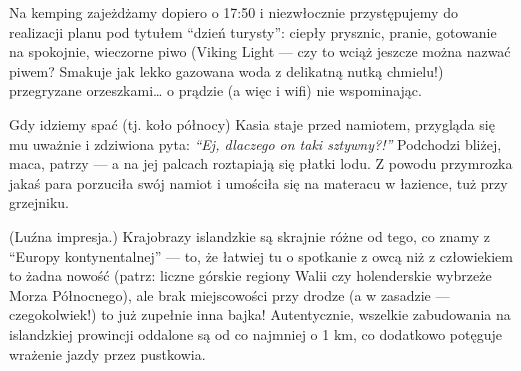 
Na kemping zajeżdżamy dopiero o 17:50 i niezwłocznie przystępujemy do realizacji planu pod tytułem “dzień turysty”: ciepły prysznic, pranie, gotowanie na spokojnie, wieczorne piwo (Viking Light --- czy to wciąż jeszcze można nazwać piwem? Smakuje jak lekko gazowana woda z delikatną nutką chmielu!) przegryzane orzeszkami… o prądzie (a więc i wifi) nie wspominając.

Gdy idziemy spać (tj. koło północy) Kasia staje przed namiotem, przygląda się mu uważnie i zdziwiona pyta: \emph{“Ej, dlaczego on taki sztywny?!”} Podchodzi bliżej, maca, patrzy --- a na jej palcach roztapiają się płatki lodu. Z powodu przymrozka jakaś para porzuciła swój namiot i umościła się na materacu  w łazience, tuż przy grzejniku.


(Luźna impresja.) Krajobrazy islandzkie są skrajnie różne od tego, co znamy z “Europy kontynentalnej” --- to, że łatwiej tu o spotkanie z owcą niż z człowiekiem to żadna nowość (patrz: liczne górskie regiony Walii czy holenderskie wybrzeże Morza Północnego), ale brak miejscowości przy drodze (a w zasadzie --- czegokolwiek!) to już zupełnie inna bajka! Autentycznie, wszelkie zabudowania na islandzkiej prowincji oddalone są od  co najmniej o 1 km, co dodatkowo potęguje wrażenie jazdy przez pustkowia.


